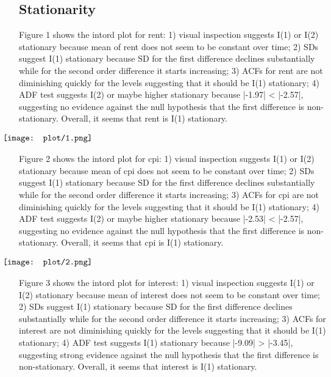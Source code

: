 \documentclass[12pt, times]{article}
\begin{document}
\subsection{Stationarity}
Figure 1 shows the intord plot for rent: 1)	visual inspection suggests I(1) or I(2) stationary because mean of rent does not seem to be constant over time; 2) SDs suggest I(1) stationary because SD for the first difference declines substantially while for the second order difference it starts increasing; 3) ACFs for rent are not diminishing quickly for the levels suggesting that it should be I(1) stationary; 4)	ADF test suggests I(2) or maybe higher stationary because |-1.97| < |-2.57|, suggesting no evidence against the null hypothesis that the first difference is non-stationary. Overall, it seems that rent is I(1) stationary.
\begin{figure}[H]
\begin{center}
$
\begin{array}
[c]{cc}%
\makebox[0pt]{\texttt{[image: plot/1.png]}}
\end{array}
$
\end{center}
\vspace{-1.5em}
\caption{}
\end{figure}
\vspace{-1.5em}
\hspace{1.5em}Figure 2 shows the intord plot for cpi: 1) visual inspection suggests I(1) or I(2) stationary because mean of cpi does not seem to be constant over time; 2) SDs suggest I(1) stationary because SD for the first difference declines substantially while for the second order difference it starts increasing; 3) ACFs for cpi are not diminishing quickly for the levels suggesting that it should be I(1) stationary; 4) ADF test suggests I(2) or maybe higher stationary because |-2.53| < |-2.57|, suggesting no evidence against the null hypothesis that the first difference is non-stationary. Overall, it seems that cpi is I(1) stationary.
\begin{figure}[H]
\begin{center}
$
\begin{array}
[c]{cc}%
\makebox[0pt]{\texttt{[image: plot/2.png]}}
\end{array}
$
\end{center}
\vspace{-1.5em}
\caption{}
\end{figure}
\vspace{-1.5em}
\hspace{1.5em}Figure 3 shows the intord plot for interest: 1) visual inspection suggests I(1) or I(2) stationary because mean of interest does not seem to be constant over time; 2) SDs suggest I(1) stationary because SD for the first difference declines substantially while for the second order difference it starts increasing; 3) ACFs for interest are not diminishing quickly for the levels suggesting that it should be I(1) stationary; 4) ADF test suggests I(1) stationary because |-9.09| > |-3.45|, suggesting strong evidence against the null hypothesis that the first difference is non-stationary. Overall, it seems that interest is I(1) stationary.
\end{document}

